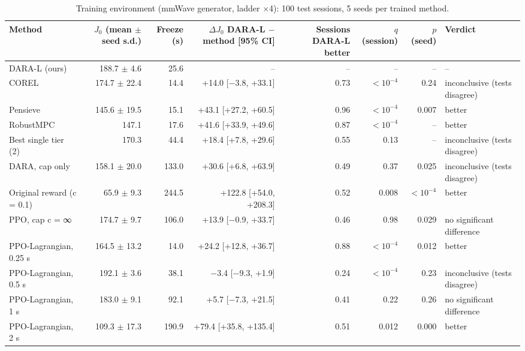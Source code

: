 \begin{table}[t]\centering\footnotesize
\caption{Training environment (mmWave generator, ladder $\times$4): 100 test sessions, 5 seeds per trained method.}
\label{tab:training}
\begin{tabular}{lrrrrrrl}\toprule
Method & $J_0$ (mean $\pm$ seed s.d.) & Freeze (s) & $\Delta J_0$ DARA-L $-$ method [95\% CI] & Sessions DARA-L better & $q$ (session) & $p$ (seed) & Verdict \\\midrule
DARA-L (ours) & 188.7 $\pm$ 4.6 & 25.6 & -- & -- & -- & -- & -- \\
COREL & 174.7 $\pm$ 22.4 & 14.4 & +14.0 [$-$3.8, +33.1] & 0.73 & $<10^{-4}$ & 0.24 & inconclusive (tests disagree) \\
Pensieve & 145.6 $\pm$ 19.5 & 15.1 & +43.1 [+27.2, +60.5] & 0.96 & $<10^{-4}$ & 0.007 & better \\
RobustMPC & 147.1 & 17.6 & +41.6 [+33.9, +49.6] & 0.87 & $<10^{-4}$ & -- & better \\
Best single tier (2) & 170.3 & 44.4 & +18.4 [+7.8, +29.6] & 0.55 & 0.13 & -- & inconclusive (tests disagree) \\
DARA, cap only & 158.1 $\pm$ 20.0 & 133.0 & +30.6 [+6.8, +63.9] & 0.49 & 0.37 & 0.025 & inconclusive (tests disagree) \\
Original reward (c = 0.1) & 65.9 $\pm$ 9.3 & 244.5 & +122.8 [+54.0, +208.3] & 0.52 & 0.008 & $<10^{-4}$ & better \\
PPO, cap c = ∞ & 174.7 $\pm$ 9.7 & 106.0 & +13.9 [$-$0.9, +33.7] & 0.46 & 0.98 & 0.029 & no significant difference \\
PPO-Lagrangian, 0.25 s & 164.5 $\pm$ 13.2 & 14.0 & +24.2 [+12.8, +36.7] & 0.88 & $<10^{-4}$ & 0.012 & better \\
PPO-Lagrangian, 0.5 s & 192.1 $\pm$ 3.6 & 38.1 & $-$3.4 [$-$9.3, +1.9] & 0.24 & $<10^{-4}$ & 0.23 & inconclusive (tests disagree) \\
PPO-Lagrangian, 1 s & 183.0 $\pm$ 9.1 & 92.1 & +5.7 [$-$7.3, +21.5] & 0.41 & 0.22 & 0.26 & no significant difference \\
PPO-Lagrangian, 2 s & 109.3 $\pm$ 17.3 & 190.9 & +79.4 [+35.8, +135.4] & 0.51 & 0.012 & 0.000 & better \\
\bottomrule\end{tabular}
\end{table}
